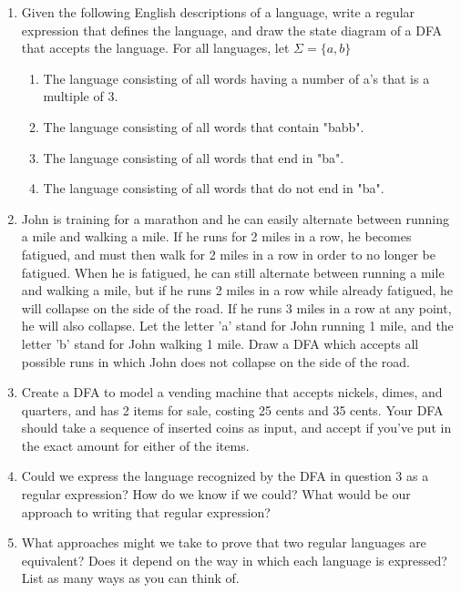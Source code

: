 
	
\begin{enumerate}
	
\item Given the following English descriptions of a language, write a regular expression that defines the language, and draw the state diagram of a DFA that accepts the language. For all languages, let $\Sigma = \{a, b\}$

\begin{enumerate}
	\item The language consisting of all words having a number of a's that is a multiple of 3.
    \item The language consisting of all words that contain "babb".
    \item The language consisting of all words that end in "ba".
    \item The language consisting of all words that do not end in "ba".

\end{enumerate}
\newpage
		
\item John is training for a marathon and he can easily alternate between running a mile and walking a mile. If he runs for 2 miles in a row, he becomes fatigued, and must then walk for 2 miles in a row in order to no longer be fatigued. When he is fatigued, he can still alternate between running a mile and walking a mile, but if he runs 2 miles in a row while already fatigued, he will collapse on the side of the road. If he runs 3 miles in a row at any point, he will also collapse. Let the letter 'a' stand for John running 1 mile, and the letter 'b' stand for John walking 1 mile. Draw a DFA which accepts all possible runs in which John does not collapse on the side of the road.
		
	\newpage
\item Create a DFA to model a vending machine that accepts nickels, dimes, and quarters, and has 2 items for sale, costing 25 cents and 35 cents. Your DFA should take a sequence of inserted coins as input, and accept if you've put in the exact amount for either of the items.
		
\newpage
\item Could we express the language recognized by the DFA in question 3 as a regular expression? How do we know if we could? What would be our approach to writing that regular expression?
		
\newpage
\item What approaches might we take to prove that two regular languages are equivalent? Does it depend on the way in which each language is expressed? List as many ways as you can think of.
		
		
\end{enumerate}


